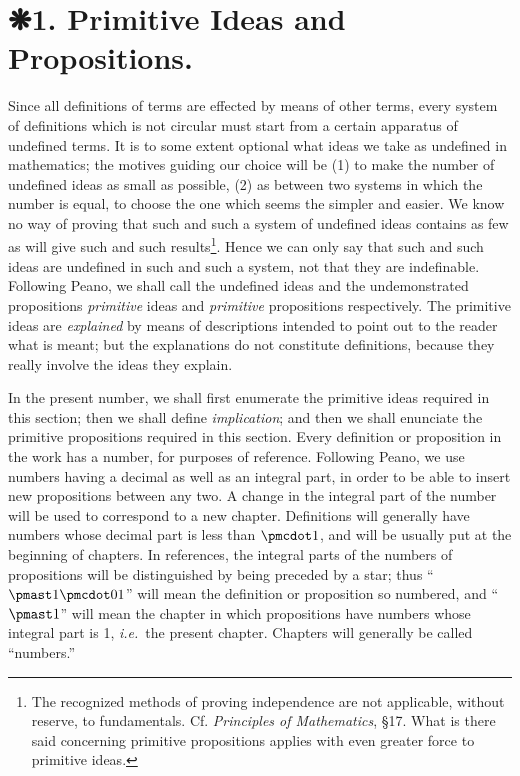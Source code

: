 \chapter*{❋1. Primitive Ideas and Propositions.} %
 Since all definitions of terms are effected by means of other terms, every system of definitions which is not circular must start from a certain apparatus of undefined terms. It is to some extent optional what ideas we take as undefined in mathematics; the motives guiding our choice will be (1) to make the number of undefined ideas as small as possible, (2) as between two systems in which the number is equal, to choose the one which seems the simpler and easier. We know no way of proving that such and such a system of undefined ideas contains as few as will give such and such results\footnote{The recognized methods of proving independence are not applicable, without reserve, to fundamentals. Cf. \textit{Principles of Mathematics}, \S17. What is there said concerning primitive propositions applies with even greater force to primitive ideas.}. Hence we can only say that such and such ideas are undefined in such and such a system, not that they are indefinable. Following Peano, we shall call the undefined ideas and the undemonstrated propositions \textit{primitive} ideas and \textit{primitive} propositions respectively. The primitive ideas are \textit{explained} by means of descriptions intended to point out to the reader what is meant; but the explanations do not constitute definitions, because they really involve the ideas they explain.

In the present number, we shall first enumerate the primitive ideas required in this section; then we shall define \textit{implication}; and then we shall enunciate the primitive propositions required in this section. Every definition or proposition in the work has a number, for purposes of reference. Following Peano, we use numbers having a decimal as well as an integral part, in order to be able to insert new propositions between any two. A change in the integral part of the number will be used to correspond to a new chapter. Definitions will generally have numbers whose decimal part is less than \(\pmcdot1\), and will be usually put at the beginning of chapters. In references, the integral parts of the numbers of propositions will be distinguished by being preceded by a star; thus ``$\pmast1\pmcdot01$'' will mean the definition or proposition so numbered, and ``$\pmast1$'' will mean the chapter in which propositions have numbers whose integral part is 1, \textit{i.e.}\ the present chapter. Chapters will generally be called ``numbers.''
